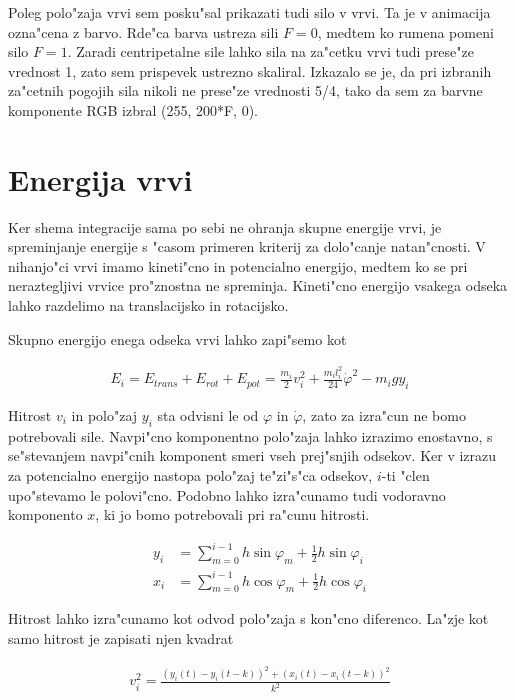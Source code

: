 \documentclass[a4paper,10pt]{article}
\renewcommand{\phi}{\varphi}
\begin{document}
Poleg polo"zaja vrvi sem posku"sal prikazati tudi silo v vrvi. Ta je v animacija ozna"cena z barvo. Rde"ca barva ustreza sili $F=0$, medtem ko rumena pomeni silo $F=1$. Zaradi centripetalne sile lahko sila na za"cetku vrvi tudi prese"ze vrednost 1, zato sem prispevek ustrezno skaliral. Izkazalo se je, da pri izbranih za"cetnih pogojih sila nikoli ne prese"ze vrednosti 5/4, tako da sem za barvne komponente RGB izbral (255, 200*F, 0). 

\section{Energija vrvi}

Ker shema integracije sama po sebi ne ohranja skupne energije vrvi, je spreminjanje energije s "casom primeren kriterij za dolo"canje natan"cnosti. V nihanjo"ci vrvi imamo kineti"cno in potencialno energijo, medtem ko se pri neraztegljivi vrvice pro"znostna ne spreminja. Kineti"cno energijo vsakega odseka lahko razdelimo na translacijsko in rotacijsko. 

Skupno energijo enega odseka vrvi lahko zapi"semo kot

\begin{align}
 E_i = E_{trans} + E_{rot} + E_{pot} = \frac{m_i}{2} v_i^2 + \frac{m_i l_i^2}{24} \dot{\phi}^2- m_i g y_i
\end{align}

Hitrost $v_i$ in polo"zaj $y_i$ sta odvisni le od $\phi$ in $\dot\phi$, zato za izra"cun ne bomo potrebovali sile. Navpi"cno komponentno polo"zaja lahko izrazimo enostavno, s se"stevanjem navpi"cnih komponent smeri vseh prej"snjih odsekov. Ker v izrazu za potencialno energijo nastopa polo"zaj te"zi"s"ca odsekov, $i$-ti "clen upo"stevamo le polovi"cno. Podobno lahko izra"cunamo tudi vodoravno komponento $x$, ki jo bomo potrebovali pri ra"cunu hitrosti. 

\begin{align}
 y_i &= \sum_{m=0}^{i-1} h \sin \phi_m + \frac{1}{2}h\sin\phi_i \\
 x_i &= \sum_{m=0}^{i-1} h \cos \phi_m + \frac{1}{2}h\cos\phi_i
\end{align}

Hitrost lahko izra"cunamo kot odvod polo"zaja s kon"cno diferenco. La"zje kot samo hitrost je zapisati njen kvadrat

\begin{align}
 v_i^2 = \frac{\left(y_i(t) - y_i(t-k)\right)^2 + \left(x_i(t) - x_i(t-k)\right)^2}{k^2}
\end{align}
\end{document}
